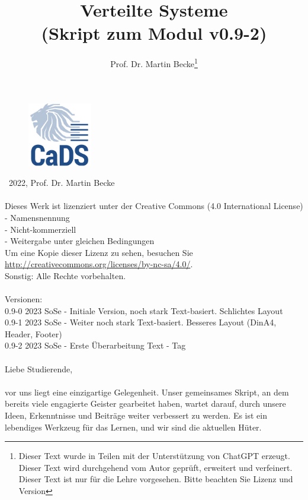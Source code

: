 \documentclass[a4paper]{article}
\title{Verteilte Systeme\\ (Skript zum Modul v0.9-2)}
\author{Prof. Dr. Martin Becke\footnote{Dieser Text wurde in Teilen mit der Unterstützung von ChatGPT erzeugt. Dieser Text{} wird durchgehend vom Autor geprüft, erweitert und verfeinert. Dieser Text ist nur für die Lehre vorgesehen. Bitte beachten Sie Lizenz und Version}}
\begin{document}
\maketitle
\vspace*{\fill} %
\begin{figure}[h]
  \centering
  \includegraphics[width=0.25\textwidth]{fig/graphics/CADS_Logo_Quadrat_300x300_RGB_72dpi.jpg} %
\end{figure}
\vspace*{\fill}

\newpage
\noindent
\textcopyright\ 2022, Prof. Dr. Martin Becke\\\\ 
Dieses Werk ist lizenziert unter der Creative Commons (4.0 International License)\\
- Namensnennung\\ - Nicht-kommerziell\\ - Weitergabe unter gleichen Bedingungen \\Um eine Kopie dieser Lizenz zu sehen, besuchen Sie\\ \url{http://creativecommons.org/licenses/by-nc-sa/4.0/}.\\
Sonstig: Alle Rechte vorbehalten.
\noindent
\\\\
Versionen:\\
0.9-0 2023 SoSe - Initiale Version, noch stark Text-basiert. Schlichtes Layout\\
0.9-1 2023 SoSe - Weiter noch stark Text-basiert. Besseres Layout (DinA4, Header, Footer)\\
0.9-2 2023 SoSe - Erste Überarbeitung Text - Tag
\\\\
Liebe Studierende,\\\\ vor uns liegt eine einzigartige Gelegenheit. Unser gemeinsames Skript, an dem bereits viele engagierte Geister gearbeitet haben, wartet darauf, durch unsere Ideen, Erkenntnisse und Beiträge weiter verbessert zu werden. Es ist ein lebendiges Werkzeug für das Lernen, und wir sind die aktuellen Hüter.
\end{document}
